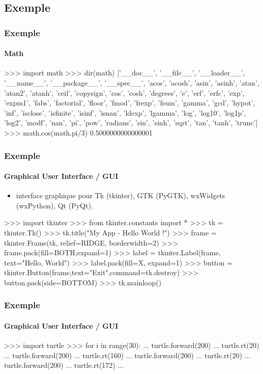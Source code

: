 \subsection{Exemple}
\begin{frame}[fragile]
\frametitle{Exemple}
\framesubtitle{Math}
\begin{pythonConsole}
>>> import math
>>> dir(math)
['__doc__', '__file__', '__loader__', '__name__', '__package__', '__spec__', 
'acos', 'acosh', 'asin', 'asinh', 'atan', 'atan2', 'atanh', 'ceil', 'copysign',
'cos', 'cosh', 'degrees', 'e', 'erf', 'erfc', 'exp', 'expm1', 'fabs',
'factorial', 'floor', 'fmod', 'frexp', 'fsum', 'gamma', 'gcd', 'hypot', 'inf',
'isclose', 'isfinite', 'isinf', 'isnan', 'ldexp', 'lgamma', 'log', 'log10',
'log1p', 'log2', 'modf', 'nan', 'pi', 'pow', 'radians', 'sin', 'sinh', 'sqrt',
'tan', 'tanh', 'trunc']
>>> math.cos(math.pi/3)
0.5000000000000001
\end{pythonConsole}
\end{frame}
\begin{frame}[fragile]
\frametitle{Exemple}
\framesubtitle{Graphical User Interface / GUI}
\begin{itemize}
\item interface graphique pour Tk (tkinter), GTK (PyGTK), wxWidgets (wxPython), Qt (PyQt).  
\end{itemize}
\begin{pythonConsole}
>>> import tkinter
>>> from tkinter.constants import *
>>> tk = tkinter.Tk()
>>> tk.title("My App - Hello World !")
>>> frame = tkinter.Frame(tk, relief=RIDGE, borderwidth=2)
>>> frame.pack(fill=BOTH,expand=1)
>>> label = tkinter.Label(frame, text="Hello, World")
>>> label.pack(fill=X, expand=1)
>>> button = tkinter.Button(frame,text="Exit",command=tk.destroy)
>>> button.pack(side=BOTTOM)
>>> tk.mainloop()
\end{pythonConsole}
\begin{center}
\end{center}
\end{frame}
\begin{frame}[fragile]
\frametitle{Exemple}
\framesubtitle{Graphical User Interface / GUI}
\begin{pythonConsole}
>>> import turtle
>>> for i in range(30): 
...     turtle.forward(200)
...     turtle.rt(20)
...     turtle.forward(200)
...     turtle.rt(160)
...     turtle.forward(200)
...     turtle.rt(20)
...     turtle.forward(200)
...     turtle.rt(172)
... 
\end{pythonConsole}
\begin{center}
\end{center}
\end{frame}
